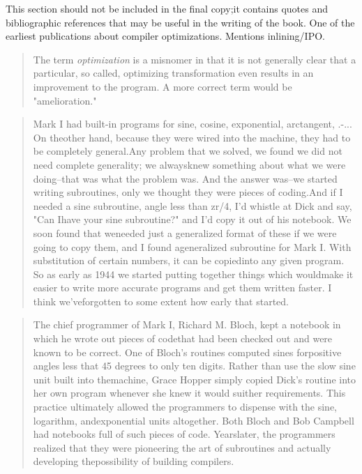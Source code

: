 This section should not be included in the final copy;it contains quotes and bibliographic references that may be useful in the writing of the book.\vspace{1em}
One of the earliest publications about compiler optimizations. Mentions inlining/IPO.\begin{quotation}
The term \textit{optimization}
 is a misnomer in that it is not generally clear that a particular, so called, optimizing transformation even results in an improvement to the program. A more correct term would be "amelioration."\end{quotation}
\begin{quotation}
    Mark I had built-in programs for sine, cosine, exponential, arctangent, .-... On theother hand, because they were wired into the machine, they had to be completely general.Any problem that we solved, we found we did not need complete generality; we alwaysknew something about what we were doing--that was what the problem was. And the answer was--we started writing subroutines, only we thought they were pieces of coding.And if I needed a sine subroutine, angle less than zr/4, I'd whistle at Dick and say, "Can Ihave your sine subroutine?" and I'd copy it out of his notebook. We soon found that weneeded just a generalized format of these if we were going to copy them, and I found ageneralized subroutine for Mark I. With substitution of certain numbers, it can be copiedinto any given program. So as early as 1944 we started putting together things which wouldmake it easier to write more accurate programs and get them written faster. I think we'veforgotten to some extent how early that started.\end{quotation}
\begin{quotation}
The chief programmer of Mark I, Richard M. Bloch, kept a notebook in which he wrote out pieces of codethat had been checked out and were known to be correct. One of Bloch's routines computed sines forpositive angles less that 45 degrees to only ten digits. Rather than use the slow sine unit built into themachine, Grace Hopper simply copied Dick's routine into her own program whenever she knew it would suither requirements. This practice ultimately allowed the programmers to dispense with the sine, logarithm, andexponential units altogether. Both Bloch and Bob Campbell had notebooks full of such pieces of code. Yearslater, the programmers realized that they were pioneering the art of subroutines and actually developing thepossibility of building compilers.\end{quotation}
